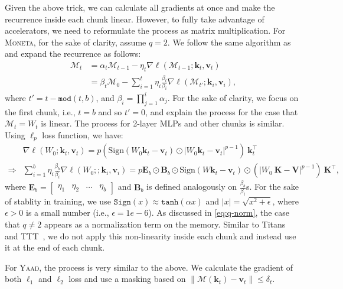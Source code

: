 \documentclass{article}
\newcommand{\citep}{\parencite}
\newcommand{\citet}{\textcite}
\newcommand{\ymodel}[0]{\textsc{Yaad}}
\newcommand{\mmodel}[0]{\textsc{Moneta}}
\newcommand{\vk}[0]{\mathbf{k}}
\newcommand{\vvv}[0]{\mathbf{v}}
\newcommand{\M}[0]{\mathcal{M}}
\theoremstyle{plain}
\theoremstyle{definition}
\theoremstyle{remark}
\begin{document}
Given the above trick, we can calculate all gradients at once and make the recurrence inside each chunk linear. However, to fully take advantage of accelerators, we need to reformulate the process as matrix multiplication. For \mmodel{}, for the sake of clarity, assume $q = 2$. We follow the same algorithm as \citet{behrouz2024titans} and expand the recurrence as follows:
\begin{align}\nonumber
    \M_{t} &= \alpha_t \M_{t-1} - \eta_t \nabla \ell(\M_{t-1}; \vk_t, \vvv_t) \\
    &= \beta_{t} \M_0 - \sum_{i = 1}^{t} \eta_i \frac{\beta_{t}}{\beta_{i}} \nabla \ell(\M_{t'}; \vk_i, \vvv_i),
\end{align}
where $t' = t - \texttt{mod}(t, b)$, and $\beta_{i} = \prod_{j=1}^{i}\alpha_j$. For the sake of clarity, we focus on the first chunk, i.e., $t = b$ and so $t' = 0$, and explain the process for the case that $\M_{t} = W_t$ is linear. The process for 2-layer MLPs and other chunks is similar. Using $\ell_p$ loss function, we have:
\begin{align}\nonumber
    &\nabla \ell(W_{0};\vk_t, \vvv_t) =  p \left(\mbox{Sign}(W_0 \vk_t - \vvv_t) \odot|W_0 \vk_t - \vvv_t|^{p-1}\right)\:\vk_t^{\top} \\ \label{eq:weight-decay-matmul}
    \Rightarrow &\sum_{i = 1}^{b} \eta_i \frac{\beta_{b}}{\beta_{i}} \nabla \ell(W_{0}; ;\vk_i, \vvv_i)  = p  \mathbf{E}_b \odot \mathbf{B}_b \odot \mbox{Sign}(W \vk_t - \vvv_t) \odot (|W_0 \: \mathbf{K} - \mathbf{V}|^{p-1}) \: \mathbf{K}^{\top}, 
\end{align}
where $\mathbf{E}_b = \begin{bmatrix}
    \eta_1 & \eta_2 & \dots & \eta_b
\end{bmatrix}$ and $\mathbf{B}_b$ is defined analogously on $\frac{\beta_{b}}{\beta_{i}}$s. For the sake of stablity in training, we use $\texttt{Sign}(x) \approx \texttt{tanh}\left( \alpha x \right)$ and $|x| = \sqrt{x^2 + \epsilon}$, where $\epsilon > 0$ is a small number (i.e., $\epsilon = 1e-6$). As discussed in \autoref{eq:q-norm}, the case that $q \neq 2$ appears as a normalization term on the memory. Similar to Titans~\citep{behrouz2024titans} and TTT~\citep{sun2024learning}, we do not apply this non-linearity inside each chunk and instead use it at the end of each chunk. 

For \ymodel, the process is very similar to the above. We calculate the gradient of both $\ell_1$ and $\ell_2$ loss and use a masking based on $\|\M(\vk_t) - \vvv_t\| \leq \delta_t$. 
\end{document}
